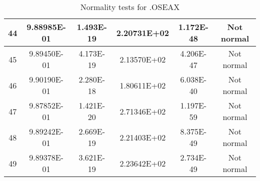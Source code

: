 \begin{table}[h]
\begin{tabular}{|c|c|c|c|c|c|}
		44 & 9.88985E-01 & 1.493E-19 & 2.20731E+02 & 1.172E-48 & Not normal\\\hline
		45 & 9.89450E-01 & 4.173E-19 & 2.13570E+02 & 4.206E-47 & Not normal\\\hline
		46 & 9.90190E-01 & 2.280E-18 & 1.80611E+02 & 6.038E-40 & Not normal\\\hline
		47 & 9.87852E-01 & 1.421E-20 & 2.71346E+02 & 1.197E-59 & Not normal\\\hline
		48 & 9.89242E-01 & 2.669E-19 & 2.21403E+02 & 8.375E-49 & Not normal\\\hline
		49 & 9.89378E-01 & 3.621E-19 & 2.23642E+02 & 2.734E-49 & Not normal\\\hline
	\end{tabular}
	\caption{Normality tests for .OSEAX}
\end{table}
